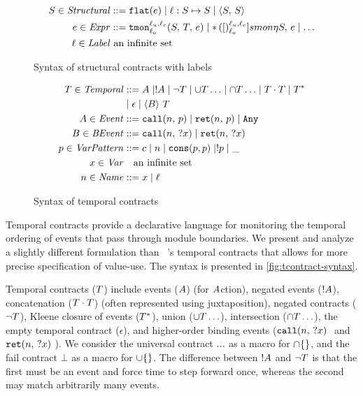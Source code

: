 \begin{figure}
  \begin{align*}
    S \in \mathit{Structural} &::= {\tt flat}(e) \mid \ell : S \mapsto S \mid \langle S,\, S\rangle
\\
    e \in \mathit{Expr} &::= {\tt tmon}{^{\ell_u,\ell_c}_{\ell_o}}({S,\,T,\,e})
                    \mid {\tt *}{\,}({[})^{\ell_u,\ell_c}_{\ell_o}]{smon}{\eta}{S,\, e}
                    \mid \ldots
\\
\ell \in \mathit{Label}&\text{ an infinite set}
  \end{align*}
  \caption{Syntax of structural contracts with labels}
  \label{fig:scontract-syntax}
\end{figure}

\begin{figure}
  \begin{align*}
 T \in \mathit{Temporal} &::=
      A \mid ! A
 \mid \neg T
 \mid \cup T\ldots
 \mid \cap T\ldots
 \mid T \cdot T
 \mid T^* \\
&\mid \epsilon
 \mid \langle B\rangle\ T
\\
A \in \mathit{Event} &::= {\tt call}(n,\, p) \mid {\tt ret}(n,\, p) \mid {\tt Any} \\
B \in \mathit{BEvent} &::= {\tt call}(n,\, {\tt ?} x) \mid {\tt ret}(n,\, {\tt ?} x) \\
p \in \mathit{VarPattern} &::= c \mid n \mid {\tt cons}(p,p) \mid ! p \mid \_ \\
x \in \mathit{Var} &\quad\text{an infinite set} \\
n \in \mathit{Name} &::= x \mid \ell
  \end{align*}
  \caption{Syntax of temporal contracts}
  \label{fig:tcontract-syntax}
\end{figure}

Temporal contracts provide a declarative language for monitoring the temporal ordering of events that pass through module boundaries.
%
We present and analyze a slightly different formulation than ~\citeauthor{ianjohnson:dfm:icfp2011}'s temporal contracts that allows for more precise specification of value-use.
%
The syntax is presented in \autoref{fig:tcontract-syntax}.

Temporal contracts ($T$) include events ($A$) (for $A$ction), negated events ($! A$), concatenation ($T \cdot T$) (often represented using juxtaposition), negated contracts ($\neg T$), Kleene closure of events ($T^*$), union ($\cup T\ldots$), intersection ($\cap T\ldots$), the empty temporal contract ($\epsilon$), and higher-order binding events ($\stcall{\mname}{\mvar}$ and $\stret{\mname}{\mvar}$).
%
We consider the universal contract ${\tt ...}$ as a macro for $\cap \{\}$, and the fail contract $\bot$ as a macro for $\cup \{\}$.
%
The difference between $! A$ and $\neg T$ is that the first must be an event and force time to step forward once, whereas the second may match arbitrarily many events.


